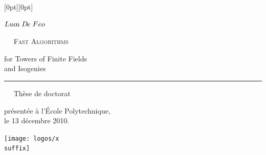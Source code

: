 %
%


\ifbw
  \def\suffix{}
\else
  \def\suffix{-color}
\fi

\begin{titlingpage}
  \setlength{\parindent}{0pt}

  \raisebox{0pt}[0pt][0pt]{\makebox[\textwidth][r]{\rule[-\textheight]{0.5pt}{\textheight}}}
  \parbox{0.9\textwidth}{
    \begin{flushright}
      \vspace{\onelineskip}
      \huge
      $Luc\kern-0.2ex a\;D\kern-0.2ex e\;Feo$
      \par\smallskip
      \scshape
      \Huge
      \ifartwork
      \def\svgwidth{1.55em}
      \def\exclfont{\small}
      \raisebox{-0.2ex}{}~~
      \fi
      \textcolor{titlecolor}{Fast Algorithms}
      \par\bigskip\huge
      for Towers of Finite Fields\\
      and Isogenies
    \end{flushright}}
  \par\smallskip
  \rule{1.1\textwidth}{0.5pt}
  
  \vfill
  \parbox{0.9\textwidth}{
    \begin{flushright}
      \huge
      \ifartwork
      ~~
      \fi
      Thèse de doctorat
      \par\bigskip\Large
      présentée à l'École Polytechnique,\\
      le 13 décembre 2010.
    \end{flushright}}

  \vfill
  \parbox{0.9\textwidth}{
    \begin{flushright}
      \Huge
      \texttt{[image: logos/x\\suffix]}
    \end{flushright}}
\end{titlingpage}




